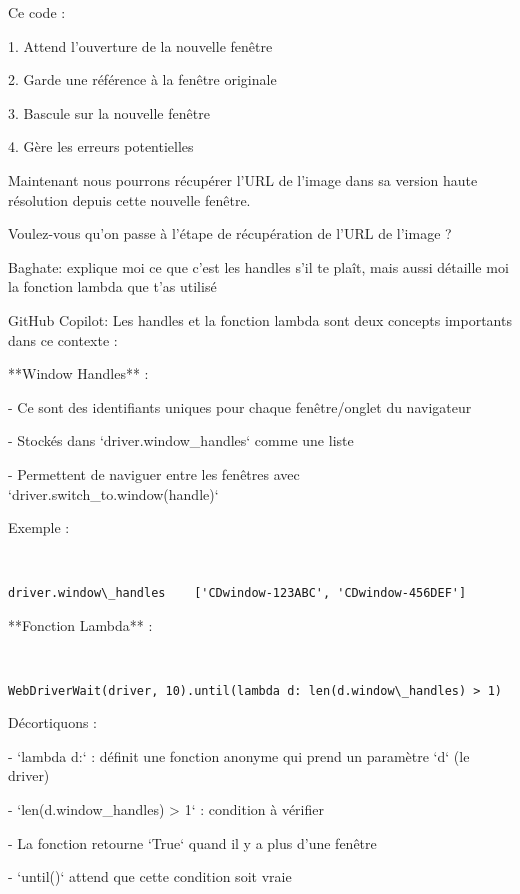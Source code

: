 Ce code :

1. Attend l'ouverture de la nouvelle fenêtre

2. Garde une référence à la fenêtre originale

3. Bascule sur la nouvelle fenêtre

4. Gère les erreurs potentielles

Maintenant nous pourrons récupérer l'URL de l'image dans sa version haute résolution depuis cette nouvelle fenêtre.

Voulez-vous qu'on passe à l'étape de récupération de l'URL de l'image ?

Baghate: explique moi ce que c'est les handles s'il te plaît, mais aussi détaille moi la fonction lambda que t'as utilisé

GitHub Copilot: Les handles et la fonction lambda sont deux concepts importants dans ce contexte :

**Window Handles** :

- Ce sont des identifiants uniques pour chaque fenêtre/onglet du navigateur

- Stockés dans `driver.window\_handles` comme une liste

- Permettent de naviguer entre les fenêtres avec `driver.switch\_to.window(handle)`

Exemple :

\begin{verbatim}


driver.window\_handles    ['CDwindow-123ABC', 'CDwindow-456DEF']

\end{verbatim}

**Fonction Lambda** :

\begin{verbatim}


WebDriverWait(driver, 10).until(lambda d: len(d.window\_handles) > 1)

\end{verbatim}

Décortiquons :

- `lambda d:` : définit une fonction anonyme qui prend un paramètre `d` (le driver)

- `len(d.window\_handles) > 1` : condition à vérifier

- La fonction retourne `True` quand il y a plus d'une fenêtre

- `until()` attend que cette condition soit vraie

